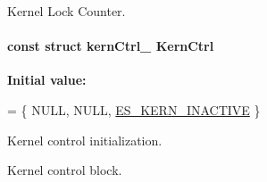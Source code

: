 Kernel Lock Counter. 

\hypertarget{group__kern__impl_ga93a7ee7768ffd94201bf1795a543194b}{
\paragraph[{Kern\-Ctrl}]{\setlength{\rightskip}{0pt plus 5cm}const struct {\bf kern\-Ctrl\-\_\-} Kern\-Ctrl}}\label{group__kern__impl_ga93a7ee7768ffd94201bf1795a543194b}
{\bfseries Initial value\-:}
\begin{DoxyCode}
= \{
    NULL,                                                                       
    NULL,                                                                       
    \hyperlink{group__kern__ctrl_ggac9be6bfeddbd6af148cdb3867fbc24afa089165cac55f315953335f5ffe41b7c4}{ES\_KERN\_INACTIVE}                                                            
\}
\end{DoxyCode}


Kernel control initialization. 

Kernel control block. 